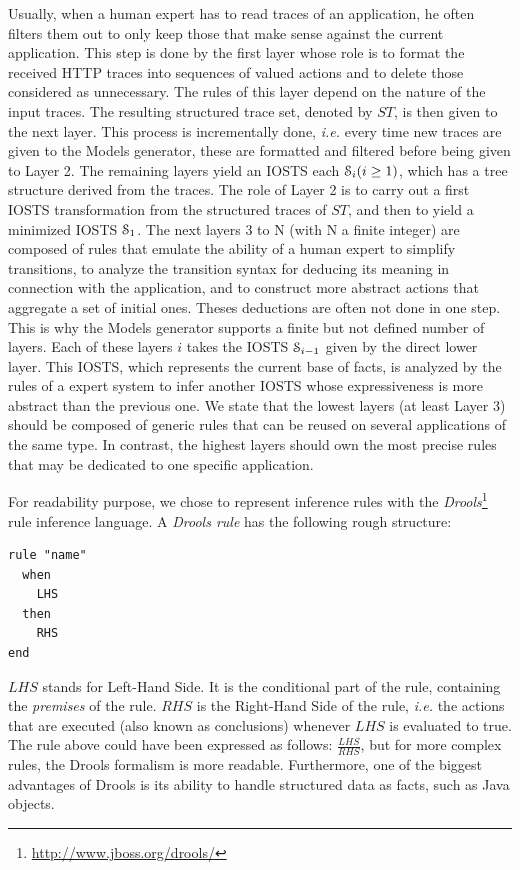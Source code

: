 Usually, when a human expert has to read traces of an
application, he often filters them out to only keep those that
make sense against the current application. This step is done by
the first layer whose role is to format the received HTTP traces
into sequences of valued actions and to delete those considered
as unnecessary. The rules of this layer depend on the nature of
the input traces. The resulting structured trace set, denoted by
$ST$, is then given to the next layer. This process is
incrementally done, \emph{i.e.} every time new traces are given to the
Models generator, these are formatted and filtered before being
given to Layer 2. The remaining layers yield an IOSTS each
$\EuScript{S}_i (i\geq 1)$, which has a tree structure derived
from the traces. The role of Layer 2 is to carry out a first
IOSTS transformation from the structured traces of $ST$, and then
to yield a minimized IOSTS $\EuScript{S}_1$. The next layers
3 to N (with N a finite integer) are composed of rules that
emulate the ability of a human expert to simplify transitions, to
analyze the transition syntax for deducing its meaning in
connection with the application, and to construct more abstract
actions that aggregate a set of initial ones. Theses deductions
are often not done in one step. This is why the Models generator
supports a finite but not defined number of layers.  Each of
these layers $i$ takes the IOSTS $\EuScript{S}_{i-1}$ given by
the direct lower layer. This IOSTS, which represents the current
base of facts, is analyzed by the rules of a expert system to
infer another IOSTS whose expressiveness is more abstract than
the previous one. We state that the lowest layers (at least Layer
3) should be composed of generic rules that can be reused on
several applications of the same type. In contrast, the highest
layers should own the most precise rules that may be dedicated to
one specific application.

For readability purpose, we chose to represent inference rules
with the
\emph{Drools}\footnote{\url{http://www.jboss.org/drools/}} rule
inference language. A \emph{Drools rule} has the following rough
structure:

\begin{BVerbatim}
rule "name"
  when
    LHS
  then
    RHS
end
\end{BVerbatim}

$LHS$ stands for Left-Hand Side. It is the conditional part of
the rule, containing the \emph{premises} of the rule. $RHS$ is
the Right-Hand Side of the rule, \emph{i.e.} the actions that are
executed (also known as conclusions) whenever $LHS$ is evaluated
to true. The rule above could have been expressed as follows:
$\frac{LHS}{RHS}$, but for more complex rules, the Drools
formalism is more readable. Furthermore, one of the biggest
advantages of Drools is its ability to handle structured data as
facts, such as Java objects.

